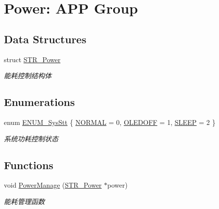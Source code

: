 \hypertarget{group___p_o_w_e_r}{\section{\-Power\-: \-A\-P\-P \-Group}
\label{group___p_o_w_e_r}
}
\subsection*{\-Data \-Structures}
\begin{DoxyCompactItemize}
\item 
struct \hyperlink{struct_s_t_r___power}{\-S\-T\-R\-\_\-\-Power}
\begin{DoxyCompactList}\small\item\em 能耗控制结构体 \end{DoxyCompactList}\end{DoxyCompactItemize}
\subsection*{\-Enumerations}
\begin{DoxyCompactItemize}
\item 
enum \hyperlink{group___p_o_w_e_r_ga91eadf2d6779b6b61c085ca51be8e7fd}{\-E\-N\-U\-M\-\_\-\-Sys\-Stt} \{ \hyperlink{group___p_o_w_e_r_gga91eadf2d6779b6b61c085ca51be8e7fda50d1448013c6f17125caee18aa418af7}{\-N\-O\-R\-M\-A\-L} =  0, 
\hyperlink{group___p_o_w_e_r_gga91eadf2d6779b6b61c085ca51be8e7fda2a4641f94255505f52278dbcf43bb2dd}{\-O\-L\-E\-D\-O\-F\-F} =  1, 
\hyperlink{group___p_o_w_e_r_gga91eadf2d6779b6b61c085ca51be8e7fdad6137abebe4fdc59e2f0f2c84bdbe3fa}{\-S\-L\-E\-E\-P} =  2
 \}
\begin{DoxyCompactList}\small\item\em 系统功耗控制状态 \end{DoxyCompactList}\end{DoxyCompactItemize}
\subsection*{\-Functions}
\begin{DoxyCompactItemize}
\item 
void \hyperlink{group___p_o_w_e_r_ga11958ae64176cfbdd9f0fbcf81123c8d}{\-Power\-Manage} (\hyperlink{struct_s_t_r___power}{\-S\-T\-R\-\_\-\-Power} $\ast$power)
\begin{DoxyCompactList}\small\item\em 能耗管理函数 \end{DoxyCompactList}\end{DoxyCompactItemize}
